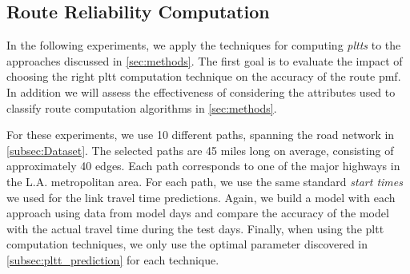 \subsection{Route Reliability Computation}
In the following experiments, we apply the techniques for computing
\textit{pltts} to the approaches discussed in \cref{sec:methods}. The first goal
is to evaluate the impact of choosing the right pltt computation technique on
the accuracy of the route pmf. In addition we will assess the effectiveness of
considering the attributes used to classify route computation algorithms in
\cref{sec:methods}.

For these experiments, we use 10 different paths, spanning the road network in
\ref{subsec:Dataset}. The selected paths are 45 miles long on average, consisting of
approximately 40 edges. Each path corresponds to one of the major highways in the L.A. metropolitan area. For each path, we use the same standard \textit{start
times} we used for the link travel time predictions. Again, we build a model
with each approach using data from model days and compare the accuracy of the
model with the actual travel time during the test days. Finally, when using the
pltt computation techniques, we only use the optimal parameter discovered in
\cref{subsec:pltt_prediction} for each technique.

